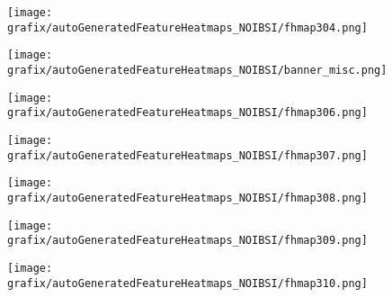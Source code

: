 \begin{subfigure}{\wid\textwidth} 
    \centering 
    \caption{\tiny \sffamily {}} 
    \vspace{\vsp} 
    \texttt{[image: grafix/autoGeneratedFeatureHeatmaps\_NOIBSI/fhmap304.png]} 
\end{subfigure} 
\hspace{\hsp} 
\begin{subfigure}{\wid\textwidth} 
    \texttt{[image: grafix/autoGeneratedFeatureHeatmaps\_NOIBSI/banner\_misc.png]} 
\end{subfigure} 
\hspace{\hsp} 
\begin{subfigure}{\wid\textwidth} 
    \centering 
    \caption{\tiny \sffamily {}} 
    \vspace{\vsp} 
    \texttt{[image: grafix/autoGeneratedFeatureHeatmaps\_NOIBSI/fhmap306.png]} 
\end{subfigure} 
\hspace{\hsp} 
\begin{subfigure}{\wid\textwidth} 
    \centering 
    \caption{\tiny \sffamily {}} 
    \vspace{\vsp} 
    \texttt{[image: grafix/autoGeneratedFeatureHeatmaps\_NOIBSI/fhmap307.png]} 
\end{subfigure} 
\hspace{\hsp} 
\begin{subfigure}{\wid\textwidth} 
    \centering 
    \caption{\tiny \sffamily {}} 
    \vspace{\vsp} 
    \texttt{[image: grafix/autoGeneratedFeatureHeatmaps\_NOIBSI/fhmap308.png]} 
\end{subfigure} 
\hspace{\hsp} 
\begin{subfigure}{\wid\textwidth} 
    \centering 
    \caption{\tiny \sffamily {}} 
    \vspace{\vsp} 
    \texttt{[image: grafix/autoGeneratedFeatureHeatmaps\_NOIBSI/fhmap309.png]} 
\end{subfigure} 
\hspace{\hsp} 
\begin{subfigure}{\wid\textwidth} 
    \centering 
    \caption{\tiny \sffamily {}} 
    \vspace{\vsp} 
    \texttt{[image: grafix/autoGeneratedFeatureHeatmaps\_NOIBSI/fhmap310.png]} 
\end{subfigure} 
